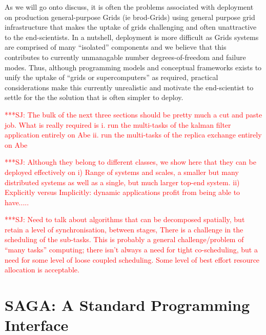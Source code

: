 \documentclass[conference,final]{IEEEtran}
\newcommand{\jhanote}[1]{ {\textcolor{red} { ***SJ: #1 }}}
\newcommand{\jhanote}[1]{}
\begin{document}
As we will go onto discuss, it is often the problems associated with
deployment on production general-purpose Grids (ie brod-Grids) using
general purpose grid infrastructure that makes the uptake of grids
challenging and often unattractive to the end-scientists. In a
nutshell, deployment is more difficult as Grids systems are comprised
of many ``isolated'' components and we believe that this contributes
to currently unmanagable number degrees-of-freedom and failure modes.
Thus, although programming models and conceptual frameworks exists to
unify the uptake of ``grids or supercomputers'' as required, practical
considerations make this currently unrealistic and motivate the
end-scientist to settle for the the solution that is often simpler to
deploy. 

\jhanote{The bulk of the next three sections should be pretty much a
  cut and paste job. What is really required is i. run the multi-tasks
  of the kalman filter application entirely on Abe ii. run the
  multi-tasks of the replica exchange entirely on Abe}

\jhanote{Although they belong to different classes, we show here that
  they can be deployed effectively on i) Range of systems and scales,
  a smaller but many distributed systems as well as a single, but much
  larger top-end system. ii) Explicitly versus Implicitly: dynamic
  applications profit from being able to have.....}

\jhanote{Need to talk about algorithms that can be decomposed
  spatially, but retain a level of synchronisation, between stages,
  There is a challenge in the scheduling of the sub-tasks.  This is
  probably a general challenge/problem of ``many tasks'' computing;
  there isn't always a need for tight co-scheduling, but a need for
  some level of loose coupled scheduling.  Some level of best effort
  resource allocation is acceptable.}

\section{SAGA: A Standard Programming Interface}
\end{document}

